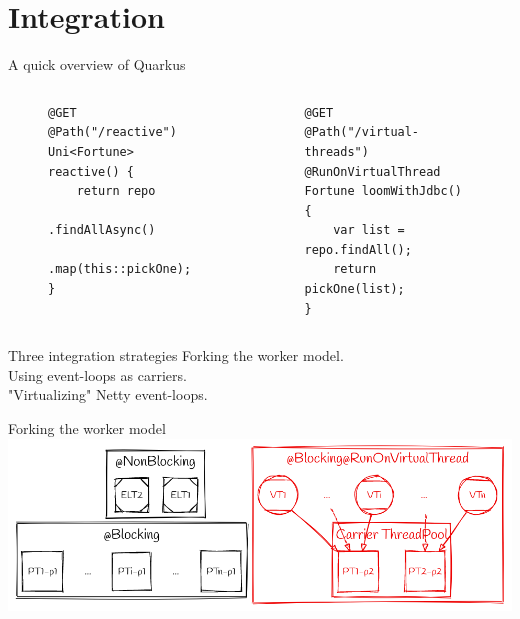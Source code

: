 \documentclass{beamer}
\begin{document}
\section{Integration}
\begin{frame}[fragile]{A quick overview of Quarkus}
    \begin{columns}
        \begin{column}{0.55\textwidth}
            \begin{figure}
                \begin{lstlisting}
@GET
@Path("/reactive")
Uni<Fortune> reactive() {
    return repo
        .findAllAsync()
        .map(this::pickOne);
}
                \end{lstlisting}
            \end{figure}
        \end{column}
        \begin{column}{0.55\textwidth}
            \begin{figure}
                \begin{lstlisting}
@GET
@Path("/virtual-threads")
@RunOnVirtualThread
Fortune loomWithJdbc() {
    var list = repo.findAll();
    return pickOne(list);
}
                \end{lstlisting}
            \end{figure}
        \end{column}
    \end{columns}
\end{frame}
\begin{frame}{Three integration strategies}
    \Large
    Forking the worker model.\\
    \vspace{1cm}
    Using event-loops as carriers.\\
    \vspace{1cm}
    "Virtualizing" Netty event-loops.
    \normalsize
\end{frame}
\begin{frame}{Forking the worker model}
    \includegraphics[width=\textwidth]{assets/forking_workers.png}
\end{frame}
\end{document}
